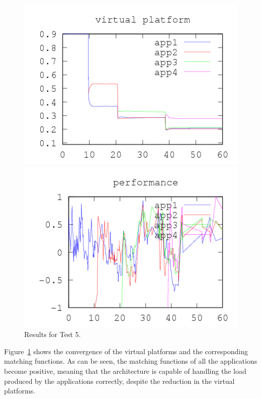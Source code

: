 \documentclass[nobiblatex]{LTHthesis}
\begin{document}
\begin{figure}[th]
\centering
  \begin{minipage}{0.49\textwidth}
  \centering
  \includegraphics[width=\textwidth]{"tools/plot/logs/test5/vp"}
  \end{minipage}
  \hfill
  \begin{minipage}{0.49\textwidth}
  \centering
  \includegraphics[width=\textwidth]{"tools/plot/logs/test5/f"}
  \end{minipage}
\caption{Results for Test 5.}
\label{fig:test5}
\end{figure}

Figure~\ref{fig:test5} shows the convergence of the virtual platforms
and the corresponding matching functions. As can be seen, the matching
functions of all the applications become positive, meaning that the
architecture is capable of handling the load produced by the applications
correctly, despite the reduction in the virtual platforms.
\end{document}

